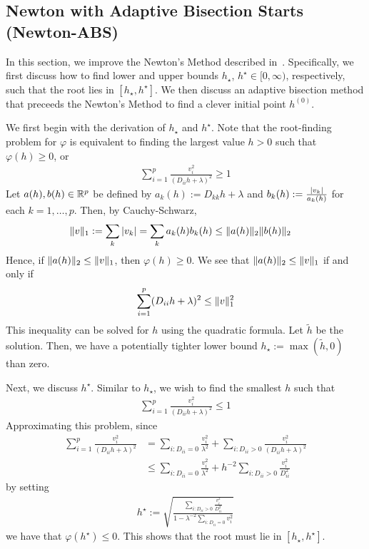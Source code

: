\subsection{Newton with Adaptive Bisection Starts (Newton-ABS)}\label{ssec:newton-abs}

In this section, we improve the Newton's Method described in~.
Specifically, we first discuss how to find lower and upper bounds $h_\star$, $h^\star \in [0,\infty)$,
respectively, such that the root lies in $[h_\star, h^\star]$.
We then discuss an adaptive bisection method that preceeds the Newton's Method
to find a clever initial point $h^{(0)}$.

We first begin with the derivation of $h_\star$ and $h^\star$.
Note that the root-finding problem for $\varphi$
is equivalent to finding the largest value $h > 0$ such that $\varphi(h) \geq 0$, or
\begin{align*}
    \sum\limits_{i=1}^p
    \frac{v_i^2}{(D_{ii} h + \lambda)^2}
    \geq
    1
\end{align*}
Let $a(h), b(h) \in \mathbb{R}^p$ be defined by $a_k(h) := D_{kk} h + \lambda$
and $b_k(h) := \frac{\left|v_k\right|}{a_k(h)}$ for each $k=1,\ldots, p$.
Then, by Cauchy-Schwarz,
\begin{align*}
    \|v\|_1
    &:=
    \sum\limits_{k} \left|v_k\right|
    =
    \sum\limits_{k} a_k(h) b_k(h)
    \leq
    \|a(h)\|_{2} \|b(h)\|_2
\end{align*}
Hence, if $\|a(h)\|_2 \leq \|v\|_1$,
then $\varphi(h) \geq 0$.
We see that $\|a(h)\|_2 \leq \|v\|_1$ if and only if
\begin{align*}
    \sum\limits_{i=1}^p
    (D_{ii} h + \lambda)^2
    \leq
    \|v\|_1^2
\end{align*}
This inequality can be solved for $h$ using the quadratic formula.
Let $\tilde{h}$ be the solution.
Then, we have a potentially tighter lower bound $h_\star := \max(\tilde{h}, 0)$ than zero.

Next, we discuss $h^\star$.
Similar to $h_\star$, we wish to find the smallest $h$ such that
\begin{align*}
    \sum\limits_{i=1}^p
    \frac{v_i^2}{(D_{ii} h + \lambda)^2}
    \leq
    1
\end{align*}
Approximating this problem, since
\begin{align}
    \sum\limits_{i=1}^p
    \frac{v_i^2}{(D_{ii} h + \lambda)^2}
    &=
    \sum\limits_{i: D_{ii} = 0}
    \frac{v_i^2}{\lambda^2}
    +
    \sum\limits_{i: D_{ii} > 0}
    \frac{v_i^2}{(D_{ii} h + \lambda)^2}
    \nonumber\\&\leq 
    \sum\limits_{i: D_{ii} = 0}
    \frac{v_i^2}{\lambda^2}
    +
    h^{-2}
    \sum\limits_{i: D_{ii} > 0}
    \frac{v_i^2}{D_{ii}^2 }
    \label{eq:nmab:upper-approx}
\end{align}
by setting 
\begin{align*}
    h^\star
    := 
    \sqrt{
        \frac{
            \sum\limits_{i: D_{ii} > 0} \frac{v_i^2}{D_{ii}^2}
        }{
            1 - \lambda^{-2} \sum\limits_{i : D_{ii} = 0} v_i^2
        }
    }
\end{align*}
we have that $\varphi(h^\star) \leq 0$.
This shows that the root must lie in $[h_\star, h^\star]$.

